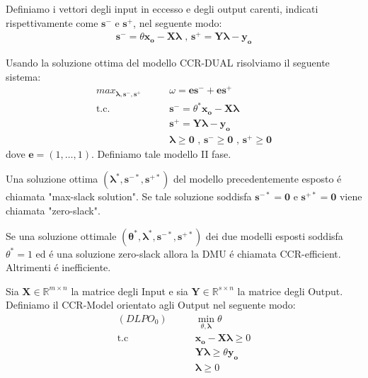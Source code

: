 \begin{definiz}
Definiamo i vettori degli input in eccesso e degli output carenti, indicati rispettivamente come $\boldsymbol{s^{-}}$ e $\boldsymbol{s^{+}}$, nel seguente modo:
\begin{equation}
\begin{split}
\boldsymbol{s^{-}} = \theta \boldsymbol{x_o} - \boldsymbol{X \lambda} \text{ , }
\boldsymbol{s^{+}} = \boldsymbol{Y \lambda} -\boldsymbol{y_o}
\end{split}
\end{equation}
\end{definiz}
\begin{definiz} Usando la soluzione ottima del modello CCR-DUAL risolviamo il seguente sistema:
\begin{equation} \label{EQ:ccr-leq2}
\begin{split}
max_{\boldsymbol{\lambda, s^{-},s^{+}}} & \qquad \omega = \boldsymbol{es^{-} + es^{+}} \\ \text{t.c.} & \qquad \boldsymbol{s^{-}} = \theta^{*}\boldsymbol{x_o - X\lambda} \\ & \qquad
\boldsymbol{s^{+}} = \boldsymbol{Y\lambda - y_o} \\ & \qquad \boldsymbol{\lambda \geq 0 \text{ , } s^{-} \geq 0 \text{ , } s^{+} \geq 0} 
\end{split}
\end{equation}
dove $\boldsymbol{e} = (1,\ldots ,1)$. Definiamo tale modello II fase.
\end{definiz}
\begin{definiz}
Una soluzione ottima $(\boldsymbol{\lambda^*, s^{-*}, s^{+*}})$ del modello precedentemente esposto \'e  chiamata "max-slack solution". Se tale soluzione soddisfa $\boldsymbol{s^{-*} = 0}$ e $\boldsymbol{s^{+*} = 0}$ viene chiamata "zero-slack".
\end{definiz}
\begin{definiz}
Se una soluzione ottimale $(\boldsymbol{\theta^{*},\lambda^*, s^{-*}, s^{+*}})$ dei due modelli esposti soddisfa $\theta^* = 1$ ed \'e una soluzione zero-slack allora la DMU \'e chiamata CCR-efficient. Altrimenti \'e inefficiente.
\end{definiz}
\begin{definiz}
Sia $\boldsymbol{X} \in \mathbb{R}^{m \times n}$ la matrice degli Input e sia $\boldsymbol{Y} \in \mathbb{R}^{s \times n}$  la matrice degli Output. Definiamo il CCR-Model orientato agli Output nel seguente modo:
\begin{equation} \label{eq1}
\begin{split}
(DLPO_0) \qquad & \min_{\theta, \boldsymbol{\lambda}} \theta \\
\text{t.c} \qquad & \boldsymbol{x_o} - \boldsymbol{X\lambda} \geq 0 \\
& \boldsymbol{Y\lambda} \geq \theta\boldsymbol{y_o} \\
& \boldsymbol{\lambda} \geq 0
\end{split}
\end{equation}
\end{definiz}

